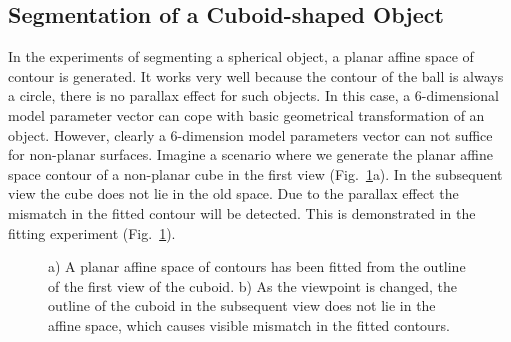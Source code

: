 \subsection{Segmentation of a Cuboid-shaped Object}
\label{sec:s3o}
In the experiments of segmenting a spherical object, a planar
affine space of contour is generated. It works very well because the
contour of the ball is always a circle, there is no parallax effect
for such objects. In this case, a 6-dimensional model parameter vector
can cope with basic geometrical transformation of an object. However,
clearly a 6-dimension model parameters vector can not
suffice for non-planar surfaces. Imagine a scenario where we generate the  planar affine
space contour of a non-planar cube in the first view (Fig.~\ref{fig:box_mismatch}a). In the
subsequent view the cube does not lie in the old
space. Due to the parallax effect the mismatch in the fitted contour
will be detected. This is demonstrated in the fitting experiment (Fig.~\ref{fig:box_mismatch}).
\begin{figure}[htbp]
  \begin{minipage}[t]{0.5\linewidth} 
    \centering 
  \end{minipage}%
  \begin{minipage}[t]{0.5\linewidth} 
    \centering 
  \end{minipage} 
  \caption[Planar space can not encompass a general non-planar
  contour]{a) A planar affine space of contours has been fitted from
    the outline of the first view of the cuboid. b) As the viewpoint
    is changed, the outline of the cuboid in the subsequent view does
    not lie in the affine space, which causes visible mismatch in the
    fitted contours.}
\label{fig:box_mismatch}
\end{figure}



